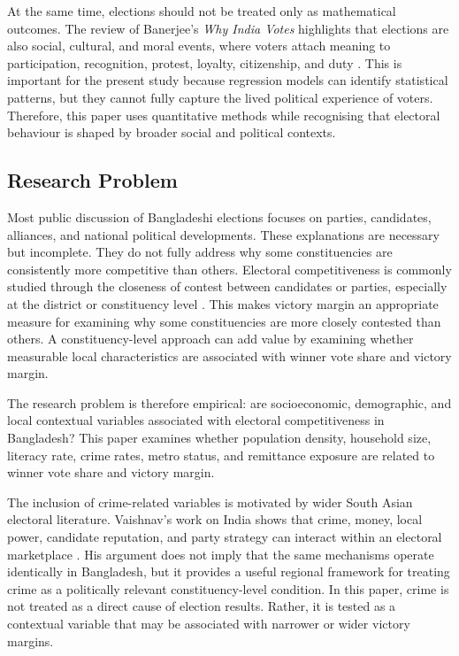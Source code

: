 \documentclass[12pt,a4paper]{article}
\begin{document}
At the same time, elections should not be treated only as mathematical outcomes. The review of Banerjee's \textit{Why India Votes} highlights that elections are also social, cultural, and moral events, where voters attach meaning to participation, recognition, protest, loyalty, citizenship, and duty \citep{das2015}. This is important for the present study because regression models can identify statistical patterns, but they cannot fully capture the lived political experience of voters. Therefore, this paper uses quantitative methods while recognising that electoral behaviour is shaped by broader social and political contexts.

\subsection{Research Problem}

Most public discussion of Bangladeshi elections focuses on parties, candidates, alliances, and national political developments. These explanations are necessary but incomplete. They do not fully address why some constituencies are consistently more competitive than others. Electoral competitiveness is commonly studied through the closeness of contest between candidates or parties, especially at the district or constituency level \citep{blais2009,cox2020}. This makes victory margin an appropriate measure for examining why some constituencies are more closely contested than others. A constituency-level approach can add value by examining whether measurable local characteristics are associated with winner vote share and victory margin.

The research problem is therefore empirical: are socioeconomic, demographic, and local contextual variables associated with electoral competitiveness in Bangladesh? This paper examines whether population density, household size, literacy rate, crime rates, metro status, and remittance exposure are related to winner vote share and victory margin.

The inclusion of crime-related variables is motivated by wider South Asian electoral literature. Vaishnav's work on India shows that crime, money, local power, candidate reputation, and party strategy can interact within an electoral marketplace \citep{vaishnav2017}. His argument does not imply that the same mechanisms operate identically in Bangladesh, but it provides a useful regional framework for treating crime as a politically relevant constituency-level condition. In this paper, crime is not treated as a direct cause of election results. Rather, it is tested as a contextual variable that may be associated with narrower or wider victory margins.
\end{document}
